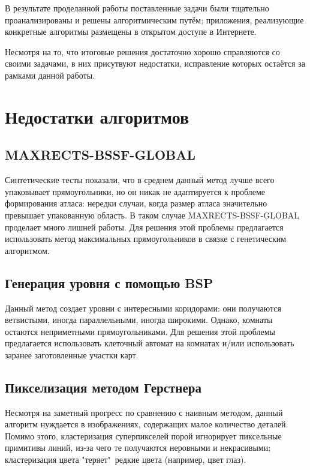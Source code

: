 \documentclass[a4paper,12pt]{report}
\begin{document}
\parindent=1cm
В результате проделанной работы поставленные задачи были тщательно проанализированы и решены алгоритмическим путём; приложения, реализующие конкретные алгоритмы размещены в открытом доступе в Интернете.

Несмотря на то, что итоговые решения достаточно хорошо справляются со своими задачами, в них присутвуют недостатки, исправление которых остаётся за рамками данной работы.

\section{Недостатки алгоритмов}
\subsection{MAXRECTS-BSSF-GLOBAL}
Синтетические тесты показали, что в среднем данный метод лучше всего упаковывает прямоугольники, но он никак не адаптируется к проблеме формирования атласа: нередки случаи, когда размер атласа значительно превышает упакованную область. В таком случае MAXRECTS-BSSF-GLOBAL проделает много лишней работы. Для решения этой проблемы предлагается использовать метод максимальных прямоугольников в связке с генетическим алгоритмом.

\subsection{Генерация уровня с помощью BSP}
Данный метод создает уровни с интересными коридорами: они получаются ветвистыми, иногда параллельными, иногда широкими. Однако, комнаты остаются неприметными прямоугольниками. Для решения этой проблемы предлагается использовать клеточный автомат на комнатах и/или использовать заранее заготовленные участки карт.

\subsection{Пикселизация методом Герстнера}
Несмотря на заметный прогресс по сравнению с наивным методом, данный алгоритм нуждается в изображениях, содержащих малое количество деталей. Помимо этого, кластеризация суперпикселей порой игнорирует пиксельные примитивы линий, из-за чего те получаются неровными и некрасивыми; кластеризация цвета "теряет"\ редкие цвета (например, цвет глаз). 



\end{document}
